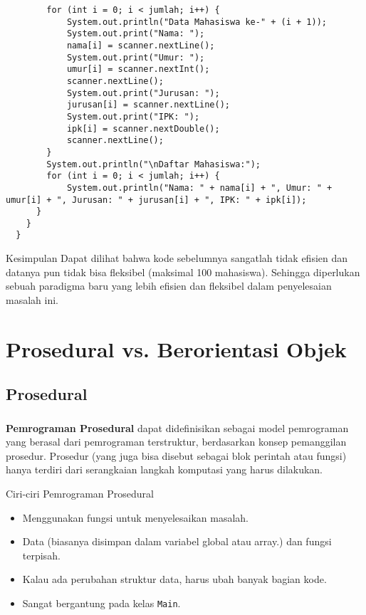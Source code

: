 \documentclass{../praktikum-ppt}
\begin{document}
  \begin{frame}[fragile]
    \begin{lstlisting}
        for (int i = 0; i < jumlah; i++) {
            System.out.println("Data Mahasiswa ke-" + (i + 1));
            System.out.print("Nama: ");
            nama[i] = scanner.nextLine();
            System.out.print("Umur: ");
            umur[i] = scanner.nextInt();
            scanner.nextLine();
            System.out.print("Jurusan: ");
            jurusan[i] = scanner.nextLine();
            System.out.print("IPK: ");
            ipk[i] = scanner.nextDouble();
            scanner.nextLine();
        }
        System.out.println("\nDaftar Mahasiswa:");
        for (int i = 0; i < jumlah; i++) {
            System.out.println("Nama: " + nama[i] + ", Umur: " + umur[i] + ", Jurusan: " + jurusan[i] + ", IPK: " + ipk[i]);
      }
    }
  }
    \end{lstlisting}
  \end{frame}

  \begin{frame}
    \begin{block}{Kesimpulan}
      Dapat dilihat bahwa kode sebelumnya sangatlah tidak efisien dan datanya pun tidak bisa fleksibel (maksimal 100 mahasiswa). Sehingga diperlukan sebuah paradigma baru yang lebih efisien dan fleksibel dalam penyelesaian masalah ini.
    \end{block}
    
  \end{frame}

  \section{Prosedural vs. Berorientasi Objek}
  \subsection{Prosedural}
  \begin{frame}
    \frametitle{\insertsection}
    \framesubtitle{\insertsubsection}
    \begin{definisi}
      \textbf{Pemrograman Prosedural} dapat didefinisikan sebagai model pemrograman yang berasal dari pemrograman terstruktur, berdasarkan konsep pemanggilan prosedur. Prosedur (yang juga bisa disebut sebagai blok perintah atau fungsi) hanya terdiri dari serangkaian langkah komputasi yang harus dilakukan.
    \end{definisi}
    \begin{block}{Ciri-ciri Pemrograman Prosedural}
      \begin{itemize}
        \item Menggunakan fungsi untuk menyelesaikan masalah.
        \item Data (biasanya disimpan dalam variabel global atau array.) dan fungsi terpisah.
        \item Kalau ada perubahan struktur data, harus ubah banyak bagian kode.
        \item Sangat bergantung pada kelas \texttt{Main}.
      \end{itemize}
    \end{block}
  \end{frame}
\end{document}
